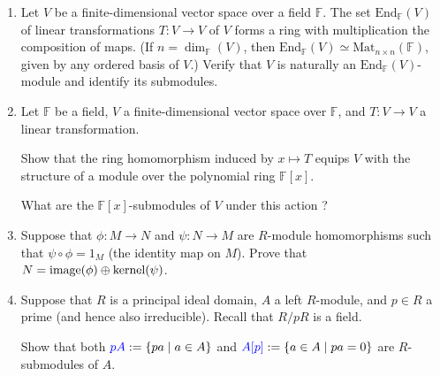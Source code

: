 \documentclass[12pt]{article}
\newcommand{\FF}{{\mathbb F}}
\newcommand{\End}{\mbox{End}}
\newcommand{\Mat}{\mbox{Mat}}
\def\defcolor#1{{\color{blue}#1}}
\begin{document}
\begin{enumerate}


\item  Let $V$ be a finite-dimensional vector space over a field $\FF$.
  The set \defcolor{$\End_{\FF}(V)$} of linear transformations $T\colon V\to V$ of $V$ forms a ring with multiplication the composition of maps.
  (If $n=\dim_\FF(V)$, then $\End_\FF(V)\simeq\Mat_{n\times n}(\FF)$, given by any ordered basis of $V$.)
  Verify that $V$ is naturally an  $\End_{\FF}(V)$-module and identify its submodules.
 \vspace{-2pt}

\item Let $\FF$ be a field, $V$ a finite-dimensional vector space over $\FF$, and $T\colon V\to V$ a linear transformation.
  
  Show that the ring homomorphism induced by $x\mapsto T$ equips $V$ with the structure of a module over the polynomial ring $\FF[x]$.

  What are the $\FF[x]$-submodules of $V$ under this action ?      
 \vspace{-2pt} 


 \item   Suppose that $\phi\colon M\to N$ and $\psi\colon N\to M$ are $R$-module homomorphisms
   such that $\psi\circ\phi=1_M$ (the identity map on $M$).
   Prove that $N=\mbox{\rm image}(\phi) \oplus\mbox{\rm kernel}(\psi)$.
   \vspace{-2pt}

 \item Suppose that $R$ is a principal ideal domain, $A$ a left $R$-module, and $p\in R$ a prime (and hence also irreducible).
   Recall that $R/pR$ is a field.
   
   Show that both $\defcolor{pA}:=\{pa\mid a\in A\}$ and $\defcolor{A[p]}:=\{a\in A\mid pa=0\}$ are $R$-submodules of $A$.


\end{enumerate}
\end{document}
